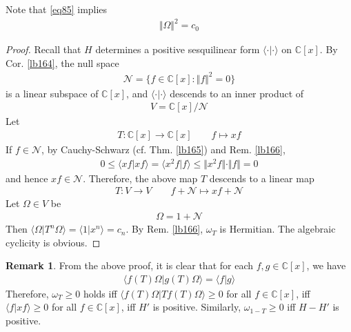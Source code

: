 \documentclass[12pt,b5paper,notitlepage]{article}
\theoremstyle{definition}
\newtheorem{rem}[df]{Remark}
\theoremstyle{plain}
\newcommand{\bk}[1]{\langle {#1}\rangle}
\newcommand{\scr}{\mathscr}
\newcommand{\Cbb}{\mathbb C}
\numberwithin{equation}{section}
\begin{document}
Note that \eqref{eq85} implies
\begin{align}\label{eq86}
\Vert \Omega\Vert^2=c_0
\end{align}


\begin{proof}
Recall that $H$ determines a positive sesquilinear form $\bk{\cdot|\cdot}$ on $\Cbb[x]$. By Cor. \ref{lb164}, the null space
\begin{align}
\scr N=\{f\in\Cbb[x]:\Vert f\Vert^2=0\}
\end{align}
is a linear subspace of $\Cbb[x]$, and $\bk{\cdot|\cdot}$ descends to an inner product of
\begin{align*}
V=\Cbb[x]/\scr N
\end{align*}
Let
\begin{align*}
T:\Cbb[x]\rightarrow\Cbb[x]\qquad f\mapsto xf
\end{align*}
If $f\in\scr N$, by Cauchy-Schwarz (cf. Thm. \ref{lb165}) and Rem. \ref{lb166},
\begin{align*}
0\leq\bk{xf|xf}=\bk{x^2f|f}\leq\Vert x^2f\Vert\cdot\Vert f\Vert=0
\end{align*}
and hence $xf\in\scr N$. Therefore, the above map $T$ descends to a linear map
\begin{align}\label{eq121}
T:V\rightarrow V\qquad f+\scr N\mapsto xf+\scr N
\end{align}
Let $\Omega\in V$ be
\begin{align*}
\Omega=1+\scr N
\end{align*}
Then $\bk{\Omega|T^n\Omega}=\bk{1|x^n}=c_n$. By Rem. \ref{lb166}, $\omega_T$ is Hermitian. The algebraic cyclicity is obvious.
\end{proof}

\begin{rem}\label{lb170}
From the above proof, it is clear that for each $f,g\in\Cbb[x]$, we have
\begin{align*}
\bk{f(T)\Omega|g(T)\Omega}=\bk{f|g}
\end{align*}
Therefore, $\omega_T\geq0$ holds iff $\bk{f(T)\Omega|Tf(T)\Omega}\geq0$ for all $f\in\Cbb[x]$, iff $\bk{f|xf}\geq0$ for all $f\in\Cbb[x]$, iff $H'$ is positive. Similarly, $\omega_{1-T}\geq0$ iff $H-H'$ is positive.
\end{rem}
\end{document}
